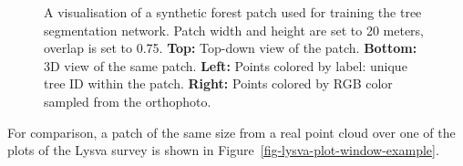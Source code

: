 \begin{figure}
\caption[Visualisation of a synthetic forest patch used for
training]{\label{fig-synthetic-forest-patch-example}A visualisation of a
synthetic forest patch used for training the tree segmentation network.
Patch width and height are set to 20 meters, overlap is set to 0.75.
\textbf{Top:} Top-down view of the patch. \textbf{Bottom:} 3D view of
the same patch. \textbf{Left:} Points colored by label: unique tree ID
within the patch. \textbf{Right:} Points colored by RGB color sampled
from the orthophoto.}
\end{figure}

For comparison, a patch of the same size from a real point cloud over one of the plots of the Lysva survey is shown in Figure~\ref{fig-lysva-plot-window-example}.

